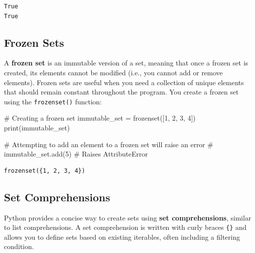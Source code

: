 \documentclass[
  letterpaper,
  DIV=11,
  numbers=noendperiod]{scrreprt}
\newenvironment{Shaded}{\begin{snugshade}}{\end{snugshade}}
\newcommand{\BuiltInTok}[1]{\textcolor[rgb]{0.00,0.23,0.31}{#1}}
\newcommand{\CommentTok}[1]{\textcolor[rgb]{0.37,0.37,0.37}{#1}}
\newcommand{\DecValTok}[1]{\textcolor[rgb]{0.68,0.00,0.00}{#1}}
\newcommand{\NormalTok}[1]{\textcolor[rgb]{0.00,0.23,0.31}{#1}}
\newcommand{\OperatorTok}[1]{\textcolor[rgb]{0.37,0.37,0.37}{#1}}
\begin{document}
\begin{verbatim}
True
True
\end{verbatim}

\hypertarget{frozen-sets}{%
\subsection{Frozen Sets}\label{frozen-sets}}

A \textbf{frozen set} is an immutable version of a set, meaning that
once a frozen set is created, its elements cannot be modified (i.e., you
cannot add or remove elements). Frozen sets are useful when you need a
collection of unique elements that should remain constant throughout the
program. You create a frozen set using the \texttt{frozenset()}
function:

\begin{Shaded}
\begin{Highlighting}[]
\CommentTok{\# Creating a frozen set}
\NormalTok{immutable\_set }\OperatorTok{=} \BuiltInTok{frozenset}\NormalTok{([}\DecValTok{1}\NormalTok{, }\DecValTok{2}\NormalTok{, }\DecValTok{3}\NormalTok{, }\DecValTok{4}\NormalTok{])}
\BuiltInTok{print}\NormalTok{(immutable\_set)  }

\CommentTok{\# Attempting to add an element to a frozen set will raise an error}
\CommentTok{\# immutable\_set.add(5)  \# Raises AttributeError}
\end{Highlighting}
\end{Shaded}

\begin{verbatim}
frozenset({1, 2, 3, 4})
\end{verbatim}

\hypertarget{set-comprehensions}{%
\subsection{Set Comprehensions}\label{set-comprehensions}}

Python provides a concise way to create sets using \textbf{set
comprehensions}, similar to list comprehensions. A set comprehension is
written with curly braces \texttt{\{\}} and allows you to define sets
based on existing iterables, often including a filtering condition.
\end{document}
